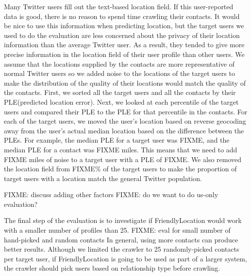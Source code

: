 \ifdefined\THESIS
    Many Twitter users fill out the text-based location field.
    If this user-reported data is good, there is no reason to spend time
    crawling their contacts.
    It would be nice to use this information when predicting location, but
    the target users we used to do the evaluation are less concerned about
    the privacy of their location information than the average Twitter user.
    As a result, they tended to give more precise information in the location
    field of their user profile than other users.
    We assume that the locations supplied by the contacts are more
    representative of normal Twitter users so we added noise to the locations
    of the target users to make the distribution of the quality of their
    locations would match the quality of the contacts.
    First, we sorted all the target users and all the contacts by their
    PLE(predicted location error).
    Next, we looked at each percentile of the target users and compared
    their PLE to the PLE for that percentile in the contacts.
    For each of the target users, we moved the user's location based on
    reverse geocoding away from the user's actual median location based on the
    difference between the PLEs.
    For example, the median PLE for a target user was FIXME, and the median
    PLE for a contact was FIXME miles.
    This means that we need to add FIXME miles of noise to a target user
    with a PLE of FIXME.
    We also removed the location field from FIXME\% of the target users to
    make the proportion of target users with a location match the general
    Twitter population.
\fi

FIXME: discuss adding other factors
FIXME: do we want to do us-only evaluation?

The final step of the evaluation is to investigate if FriendlyLocation would
work with a smaller number of profiles than 25.
%
FIXME: eval for small number of hand-picked and random contacts
%
In general, using more contacts can produce better results.
%
Although we limited the crawler to 25 randomly-picked contacts per target
user, if FriendlyLocation is going to be used as part of a larger system, the
crawler should pick users based on relationship type before crawling.



